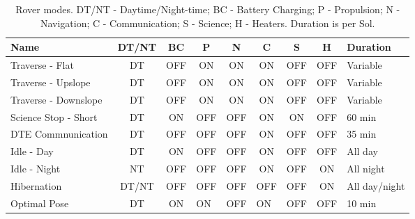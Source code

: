 \begin{table}[h]
\footnotesize
\centering
\caption[Rover modes]
    {Rover modes. DT/NT - Daytime/Night-time; BC - Battery Charging; P - Propulsion; N - Navigation; C - Communication; S - Science; H - Heaters. Duration is per Sol.}
\label{tab:rover-modes}
\begin{tabular}{|l|c|c|c|c|c|c|c|l|}
\hline
\textbf{Name} & \textbf{DT/NT} & \textbf{BC} & \textbf{P} & \textbf{N} & \textbf{C} & \textbf{S} & \textbf{H} & \textbf{Duration} \\ \hline
Traverse - Flat & DT & OFF & ON & ON & ON & OFF & OFF & Variable \\ \hline
Traverse - Upslope & DT & OFF & ON & ON & ON & OFF & OFF & Variable \\ \hline
Traverse - Downslope & DT & OFF & ON & ON & ON & OFF & OFF & Variable \\ \hline
Science Stop - Short & DT & ON & OFF & OFF & ON & ON & OFF & 60 min \\ \hline
\ac{DTE} Commnunication & DT & OFF & OFF & OFF & ON & OFF & OFF & 35 min \\ \hline
Idle - Day & DT & ON & OFF & OFF & ON & OFF & OFF & All day \\ \hline
Idle - Night & NT & OFF & OFF & OFF & ON & OFF & ON & All night \\ \hline
Hibernation & DT/NT & OFF & OFF & OFF & OFF & OFF & ON & All day/night \\ \hline
Optimal Pose & DT & ON & \multicolumn{1}{l|}{ON} & \multicolumn{1}{l|}{OFF} & \multicolumn{1}{l|}{ON} & \multicolumn{1}{l|}{OFF} & \multicolumn{1}{l|}{OFF} & 10 min \\ \hline
\end{tabular}
\end{table}
